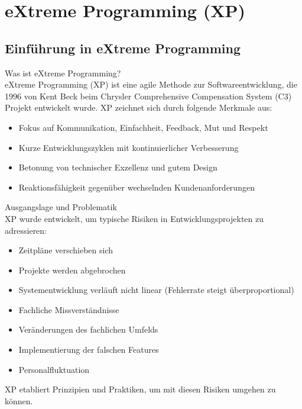\section{eXtreme Programming (XP)}

\subsection{Einführung in eXtreme Programming}

\begin{definition}{Was ist eXtreme Programming?}\\
    eXtreme Programming (XP) ist eine agile Methode zur Softwareentwicklung, die 1996 von Kent Beck beim Chrysler Comprehensive Compensation System (C3) Projekt entwickelt wurde. XP zeichnet sich durch folgende Merkmale aus:
    \begin{itemize}
        \item Fokus auf Kommunikation, Einfachheit, Feedback, Mut und Respekt
        \item Kurze Entwicklungszyklen mit kontinuierlicher Verbesserung
        \item Betonung von technischer Exzellenz und gutem Design
        \item Reaktionsfähigkeit gegenüber wechselnden Kundenanforderungen
    \end{itemize}
\end{definition}

\begin{concept}{Ausgangslage und Problematik}\\
    XP wurde entwickelt, um typische Risiken in Entwicklungsprojekten zu adressieren:
    \begin{itemize}
        \item Zeitpläne verschieben sich
        \item Projekte werden abgebrochen
        \item Systementwicklung verläuft nicht linear (Fehlerrate steigt überproportional)
        \item Fachliche Missverständnisse
        \item Veränderungen des fachlichen Umfelds
        \item Implementierung der falschen Features
        \item Personalfluktuation
    \end{itemize}
    XP etabliert Prinzipien und Praktiken, um mit diesen Risiken umgehen zu können.
\end{concept}

